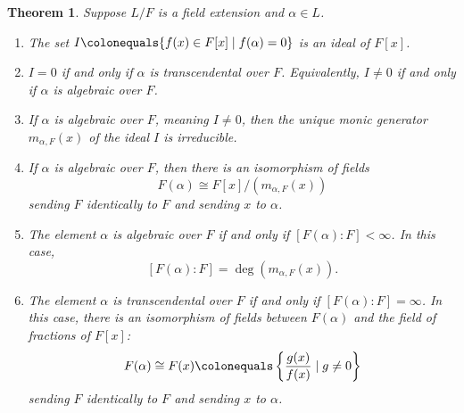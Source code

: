 \documentclass[12pt]{report}
\newtheorem{theorem}{Theorem}[chapter]
\numberwithin{equation}{section}
\numberwithin{theorem}{chapter}
\theoremstyle{definition}
\newtheorem*{basic properties}{Basic Properties}
\newtheorem*{Important Remark}{Important Remark}
\begin{document}
\begin{theorem}\label{thm algebraic vs transcendental elements}  
Suppose $L/F$ is a field extension and $\alpha \in L$.
\begin{enumerate}[label=(\arabic*)]
\item The set $I \colonequals \{f(x) \in F[x] \mid f(\alpha) = 0\}$ is an ideal of $F[x]$.
\item $I = 0$ if and only if $\alpha$ is transcendental over $F$. Equivalently, $I \neq 0$ if and only if $\alpha$ is algebraic over $F$.
\item If $\alpha$ is algebraic over $F$, meaning $I \neq 0$, then the unique monic generator $m_{\alpha, F}(x)$ of the ideal $I$ is irreducible.
\item If $\alpha$ is algebraic over $F$, then there is an isomorphism of fields
$$F(\alpha)  \cong  F[x]/(m_{\alpha, F}(x))$$
sending $F$ identically to $F$ and sending $x$ to $\alpha$.
\item The element $\alpha$ is algebraic over $F$ if and only if $[F(\alpha): F] < \infty$. In this case,
$$[F(\alpha): F] = \deg(m_{\alpha, F}(x)).$$
\item The element $\alpha$ is transcendental over $F$ if and only if $[F(\alpha): F] = \infty$. In this case, there is an isomorphism of fields between $F(\alpha)$ and the field of fractions of $F[x]$:
$$F(\alpha) \cong F(x) \colonequals \left\lbrace\frac{g(x)}{f(x)}\mid  g \neq 0 \right\rbrace$$
sending $F$ identically to $F$ and sending $x$ to $\alpha$.
\end{enumerate}
\end{theorem}
\end{document}
